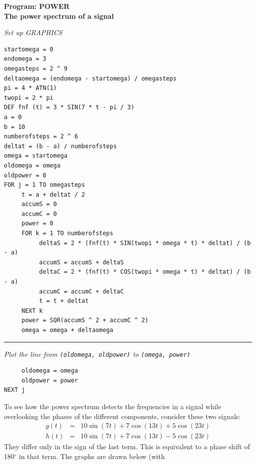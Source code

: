 {{{{\begin{center}
{\bf Program: POWER \\  
The power spectrum of a signal}
\end{center}

\footnotesize
\hspace{-20pt}
\noindent
{\sl Set up GRAPHICS}
\vspace{-11pt}
\begin{verbatim}
startomega = 0
endomega = 3
omegasteps = 2 ^ 9
deltaomega = (endomega - startomega) / omegasteps
pi = 4 * ATN(1)
twopi = 2 * pi
DEF fnf (t) = 3 * SIN(7 * t - pi / 3)
a = 0
b = 10
numberofsteps = 2 ^ 6
deltat = (b - a) / numberofsteps
omega = startomega
oldomega = omega
oldpower = 0
FOR j = 1 TO omegasteps
     t = a + deltat / 2
     accumS = 0
     accumC = 0
     power = 0
     FOR k = 1 TO numberofsteps
          deltaS = 2 * (fnf(t) * SIN(twopi * omega * t) * deltat) / (b - a)
          accumS = accumS + deltaS
          deltaC = 2 * (fnf(t) * COS(twopi * omega * t) * deltat) / (b - a)
          accumC = accumC + deltaC
          t = t + deltat
     NEXT k
     power = SQR(accumS ^ 2 + accumC ^ 2)
     omega = omega + deltaomega
\end{verbatim}

\vspace{-10pt}
\rule{23pt}{0pt} {\sl Plot the line from {\tt (oldomega, oldpower)} to {\tt (omega, power)}}

\vspace{-13pt}
\begin{verbatim}
     oldomega = omega
     oldpower = power
NEXT j
\end{verbatim}
\normalsize


	To see how the power spectrum detects the frequencies	
in a signal while overlooking the phases of the different components, consider these two  
signals:\label{testfunction}
	\begin{eqnarray*}
	g(t) &=& 10\sin(7t) + 7\cos(13t) + 5\cos(23t) \\
	h(t) &=& 10\sin(7t) + 7\cos(13t) - 5\cos(23t)
	\end{eqnarray*}
They differ only in the sign of the last term.  This is equivalent to a phase shift of 180$^\circ$ in that term.  The graphs are drawn below (with 
\linebreak  
\vspace{88pt}


}}}}
